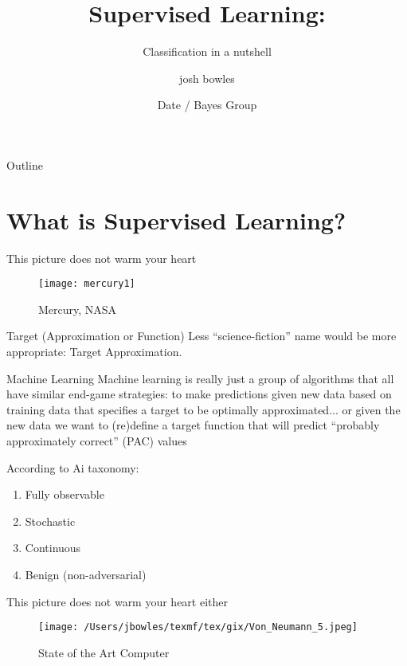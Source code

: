 \documentclass{beamer}
\title{Supervised Learning:} %
\subtitle
{Classification in a nutshell} %
\author[josh bowles] %
{josh bowles\inst{1,}\inst{2}}
\institute[University of Utah and One On One Media] %
{
  \inst{1}%
  One on One Media\\
  Software Developer
\and
  \inst{2}%
  Department of Philosophy (August 2012),\\
  Experimental Epistemology and Machine Learning\\
  University of Utah 
}
\date[\Today] %
{Date / Bayes Group}
\begin{document}
\begin{frame}
  \titlepage
\end{frame}

\begin{frame}{Outline}
  \tableofcontents
\end{frame}

\section{What is Supervised Learning?}

\begin{frame}{This picture does not warm your heart}
	\begin{figure}[htpb]
		\begin{center}
			\texttt{[image: mercury1]}\caption{\scriptsize Mercury, NASA}
		\end{center}
	\end{figure}
\end{frame}


\begin{frame}{Target (Approximation or Function)}
  Less ``science-fiction'' name would be more appropriate: Target Approximation.
  \begin{exampleblock}{\sc Machine Learning}
		Machine learning is really just a group of algorithms that all have similar end-game strategies: to make predictions given new data based on training data that specifies a target to be optimally approximated... or given the new data we want to (re)define a target function that will predict ``probably approximately correct'' (PAC) values
	\end{exampleblock}
	According to Ai taxonomy:
  \begin{enumerate} 
		\item Fully observable
		\item Stochastic
		\item Continuous
		\item Benign (non-adversarial)
  \end{enumerate}
\end{frame}

\begin{frame}{This picture does not warm your heart either}
	\begin{figure}[htpb]
		\begin{center}
			\texttt{[image: /Users/jbowles/texmf/tex/gix/Von\_Neumann\_5.jpeg]}\caption{\scriptsize State of the Art Computer}
		\end{center}
	\end{figure}
\end{frame}
\end{document}
